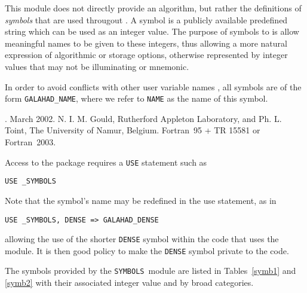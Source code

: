 \documentclass{galahad}
\newcommand{\packagename}{SYMBOLS}
\newcommand{\fullpackagename}{\libraryname\_\packagename}
\begin{document}
\galheader


\galsummary

This module does not directly provide an algorithm, but rather the definitions
of \emph{symbols} that are used througout \libraryname . A symbol is a
publicly available predefined string which can be used as an integer value.
The purpose of symbols to is allow meaningful names to be given to these
integers, thus allowing a more natural expression of algorithmic or storage
options, otherwise represented by integer values that may not be illuminating
or mnemonic.

\noindent
In order to avoid conflicts with other user variable names , all symbols are
of the form {\tt GALAHAD\_NAME}, where we refer to {\tt NAME} as the name of
this symbol.

\galattributes
\galversions{\tt  \fullpackagename}.
\galdate March 2002.
\galorigin N. I. M. Gould, Rutherford Appleton Laboratory, and
Ph. L. Toint, The University of Namur, Belgium.
\gallanguage Fortran~95 + TR 15581 or Fortran~2003.


\galhowto

Access to the package requires a {\tt USE} statement such as

\hspace{8mm} {\tt USE \fullpackagename}

\noindent
Note that the symbol's name may be redefined in the use statement, as in

\hspace{8mm} {\tt USE \fullpackagename, DENSE => GALAHAD\_DENSE}

\noindent
allowing the use of the shorter {\tt DENSE} symbol within the code that uses
the module. It is then good policy to make the {\tt DENSE} symbol private to
the code.


\galsymbols

The symbols provided by the {\tt \packagename}\ module are listed in
Tables~\ref{symb1} and \ref{symb2} with their associated integer value and by
broad categories.
\end{document}
